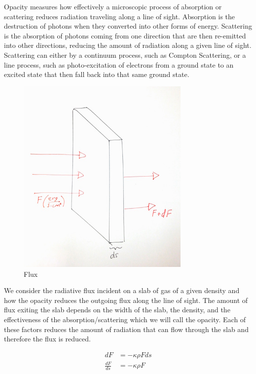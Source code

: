 \documentclass{article}
\begin{document}
Opacity measures how effectively a microscopic process of absorption or scattering reduces radiation traveling along a line of sight. Absorption is the destruction of photons when they converted into other forms of energy. Scattering is the absorption of photons coming from one direction that are then re-emitted into other directions, reducing the amount of radiation along a given line of sight. Scattering can either by a continuum process, such as Compton Scattering, or a line process, such as photo-excitation of electrons from a ground state to an excited state that then fall back into that same ground state.

\begin{figure}
    \centering
    \includegraphics[width=0.75\textwidth]{figures/Flux1.jpg}
    \caption{Flux}
    \label{fig:flux}
\end{figure}

We consider the radiative flux incident on a slab of gas of a given density and how the opacity reduces the outgoing flux along the line of sight. The amount of flux exiting the slab depends on the width of the slab, the density, and the effectiveness of the absorption/scattering which we will call the opacity. Each of these factors reduces the amount of radiation that can flow through the slab and therefore the flux is reduced. 

$$
\begin{aligned}
dF &= -\kappa \rho F ds \\
\frac{dF}{ds} &= - \kappa \rho F
\end{aligned}
$$
\end{document}
